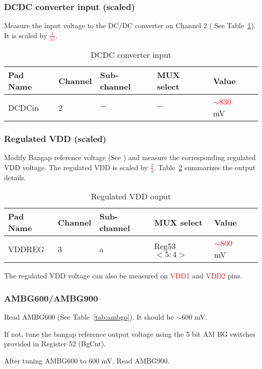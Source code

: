 \documentclass[11pt]{article}   			%
\newcommand\todo[1]{\textcolor{red}{#1}}
\begin{document}
\subsubsection{DCDC converter input (scaled)}
Measure the input voltage to the DC/DC converter on Channel 2 ( See Table~\ref{tab:dcdci}). It is scaled by \todo{$\frac{1}{15}$}.
\begin{table}[h]
  \begin{center}
\begin{tabular}{|l|l|l|l|l|l|}
\hline
{\bf Pad Name} & {\bf Channel} & {\bf Sub-channel} & {\bf MUX select} & {\bf Value} \\
\hline
DCDCin & 2 & $-$ & $-$ & \todo{$\sim$830} mV\\
\hline
\end{tabular}
\caption{DCDC converter input}
\label{tab:dcdci}
\end{center}
\end{table}

\subsubsection{Regulated VDD (scaled)}
Modify Bangap reference voltage (See \cite{bandgaprefdoc}) and measure the corresponding regulated VDD voltage.
The regulated VDD is scaled by \todo{$\frac{2}{3}$}. Table~\ref{tab:vddreg} summarizes the output details.

\begin{table}[h]
\begin{center}
\begin{tabular}{|l|l|l|l|l|l|}
\hline
{\bf Pad Name} & {\bf Channel} & {\bf Sub-channel} & {\bf MUX select} & {\bf Value} \\
\hline
VDDREG & 3 & a & Reg53$<5:4>$ & \todo{$\sim$800} mV \\
\hline
\end{tabular}
\caption{Regulated VDD ouput}
\label{tab:vddreg}
\end{center}
\end{table}

The regulated VDD voltage can also be measured on \todo{VDD1} and \todo{VDD2} pins.

\subsubsection{AMBG600/AMBG900}
\begin{compactitem}
    \item{Read AMBG600 (See Table~\ref{tab:ambgo}). It should be $\sim$600 mV.}
    \item{If not, tune the bangap reference output voltage using the 5 bit AM BG switches provided in Register 52 (BgCnt).}
    \item{After tuning AMBG600 to 600 mV, Read AMBG900.}
\end{compactitem}
\end{document}
